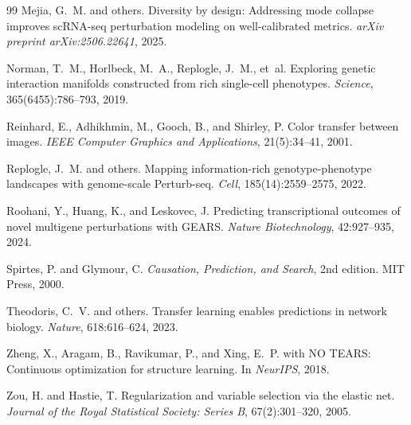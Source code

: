 \documentclass{article}
\begin{document}
\begin{thebibliography}{99}
Mejia, G.~M. and others.
\newblock Diversity by design: Addressing mode collapse improves {scRNA-seq} perturbation modeling on well-calibrated metrics.
\newblock \emph{arXiv preprint arXiv:2506.22641}, 2025.

Norman, T.~M., Horlbeck, M.~A., Replogle, J.~M., et~al.
\newblock Exploring genetic interaction manifolds constructed from rich single-cell phenotypes.
\newblock \emph{Science}, 365(6455):786--793, 2019.

Reinhard, E., Adhikhmin, M., Gooch, B., and Shirley, P.
\newblock Color transfer between images.
\newblock \emph{IEEE Computer Graphics and Applications}, 21(5):34--41, 2001.

Replogle, J.~M. and others.
\newblock Mapping information-rich genotype-phenotype landscapes with genome-scale {P}erturb-seq.
\newblock \emph{Cell}, 185(14):2559--2575, 2022.

Roohani, Y., Huang, K., and Leskovec, J.
\newblock Predicting transcriptional outcomes of novel multigene perturbations with {GEARS}.
\newblock \emph{Nature Biotechnology}, 42:927--935, 2024.

Spirtes, P. and Glymour, C.
\newblock \emph{Causation, Prediction, and Search}, 2nd edition.
\newblock MIT Press, 2000.

Theodoris, C.~V. and others.
\newblock Transfer learning enables predictions in network biology.
\newblock \emph{Nature}, 618:616--624, 2023.

Zheng, X., Aragam, B., Ravikumar, P., and Xing, E.~P.
 with {NO TEARS}: Continuous optimization for structure learning.
\newblock In \emph{NeurIPS}, 2018.

Zou, H. and Hastie, T.
\newblock Regularization and variable selection via the elastic net.
\newblock \emph{Journal of the Royal Statistical Society: Series B}, 67(2):301--320, 2005.


\end{thebibliography}
\end{document}
